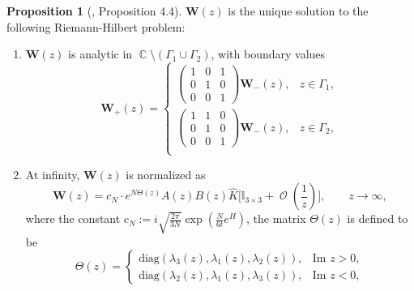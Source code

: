 \documentclass[usenames,dvipsnames]{article}
\theoremstyle{definition}
\newtheorem{prop}{Proposition}[section]
\DeclareMathOperator{\CC}{\mathbb{C}}
\DeclareMathOperator{\OO}{\mathcal{O}}
\numberwithin{equation}{section}
\numberwithin{figure}{section}
\begin{document}
\begin{prop}[\cite{DHL1}, Proposition 4.4]
    $\boldsymbol{W}(z)$ is the unique solution to the following Riemann-Hilbert problem:
    
    \begin{enumerate}
        \item $\boldsymbol{W}(z)$ is analytic in $\CC \setminus (\Gamma_1\cup \Gamma_2)$, with boundary values
            \begin{equation}
                \boldsymbol{W}_{+}(z) = 
                \begin{cases}
                    \begin{pmatrix}
                    1 & 0 & 1 \\
                    0 & 1 & 0 \\
                    0 & 0 & 1
                \end{pmatrix}\boldsymbol{W}_{-}(z), & z \in \Gamma_1,\\
                    \begin{pmatrix}
                    1 & 1 & 0 \\
                    0 & 1 & 0 \\
                    0 & 0 & 1
                \end{pmatrix}\boldsymbol{W}_{-}(z), & z \in \Gamma_2,\\
                \end{cases}
            \end{equation}
        \item At infinity, $\boldsymbol{W}(z)$ is normalized as
    \begin{equation}
        \boldsymbol{W}(z) = c_N \cdot e^{N\Theta(z)} A(z) B(z)\hat{K}\bigg[\mathbb{I}_{3\times 3} + \OO\left(\frac{1}{z}\right)\bigg], \qquad z\to \infty,
    \end{equation}
    where the constant $c_N:= i\sqrt{\frac{2\pi}{3N}}\exp\left(\frac{N}{6t}e^H\right)$, the matrix $\Theta(z)$ is defined to be
    \begin{equation} \label{Lambda-Matrix}
        \Theta(z) = 
        \begin{cases}
            \text{diag}(\lambda_3(z), \lambda_1(z),\lambda_2(z)), & \text{Im } z > 0,\\
            \text{diag}(\lambda_2(z), \lambda_1(z),\lambda_3(z)), & \text{Im } z <0,
        \end{cases} %

\end{equation}
\end{enumerate}
\end{prop}
\end{document}
